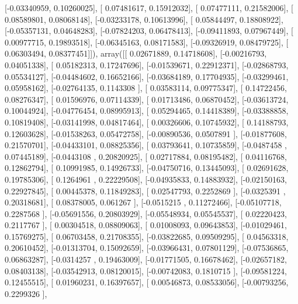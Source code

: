 \documentclass{article}
\begin{document}
       [-0.03340959,  0.10260025],
       [ 0.07481617,  0.15912032],
       [ 0.07477111,  0.21582006],
       [ 0.08589801,  0.08068148],
       [-0.03233178,  0.10613996],
       [ 0.05844497,  0.18808922],
       [-0.05357131,  0.04648283],
       [-0.07824203,  0.06478413],
       [-0.09411893,  0.07967449],
       [ 0.00977715,  0.19893518],
       [-0.06345163,  0.08171583],
       [-0.09326919,  0.08479725],
       [ 0.06303494,  0.08377451]]), array([[ 0.02671889,  0.14718608],
       [-0.00216793,  0.04051338],
       [ 0.05182313,  0.17247696],
       [-0.01539671,  0.22912371],
       [-0.02868793,  0.05534127],
       [-0.04484602,  0.16652166],
       [-0.03684189,  0.17704935],
       [-0.03299461,  0.05958162],
       [-0.02764135,  0.1143308 ],
       [ 0.03583114,  0.09775347],
       [ 0.14722456,  0.08276347],
       [ 0.01596976,  0.07114339],
       [ 0.01713486,  0.06870452],
       [-0.03613724,  0.10044924],
       [-0.04776454,  0.08995913],
       [ 0.05294465,  0.14418389],
       [-0.03388858,  0.10819408],
       [-0.03141998,  0.04817464],
       [ 0.00326606,  0.10745932],
       [ 0.14188793,  0.12603628],
       [-0.01538263,  0.05472758],
       [-0.00890536,  0.0507891 ],
       [-0.01877608,  0.21570701],
       [-0.04433101,  0.08825356],
       [ 0.03793641,  0.10735859],
       [-0.0487458 ,  0.07445189],
       [-0.0443108 ,  0.20820925],
       [ 0.02717884,  0.08195482],
       [ 0.04116768,  0.12862794],
       [ 0.10991985,  0.14926733],
       [-0.04750716,  0.13445093],
       [ 0.02691628,  0.19785306],
       [ 0.1264961 ,  0.22229508],
       [-0.04935833,  0.14883932],
       [-0.02150163,  0.22927845],
       [ 0.00445378,  0.11849283],
       [ 0.02547793,  0.2252869 ],
       [-0.0325391 ,  0.20318681],
       [ 0.08378005,  0.061267  ],
       [-0.0515215 ,  0.11272466],
       [-0.05107718,  0.2287568 ],
       [-0.05691556,  0.20803929],
       [-0.05548934,  0.05545537],
       [ 0.02220423,  0.2117767 ],
       [ 0.00304518,  0.08809063],
       [ 0.01008093,  0.09643853],
       [-0.01029461,  0.15769275],
       [ 0.06703458,  0.21708355],
       [-0.03822685,  0.09509295],
       [ 0.04563318,  0.20610452],
       [-0.01313704,  0.15092659],
       [-0.03966431,  0.07801129],
       [-0.07536865,  0.06863287],
       [-0.0314257 ,  0.19463009],
       [-0.01771505,  0.16678462],
       [-0.02657182,  0.08403138],
       [-0.03542913,  0.08120015],
       [-0.00742083,  0.1810715 ],
       [-0.09581224,  0.12455515],
       [ 0.01960231,  0.16397657],
       [ 0.00546873,  0.08533056],
       [-0.00793256,  0.2299326 ],
\end{document}
